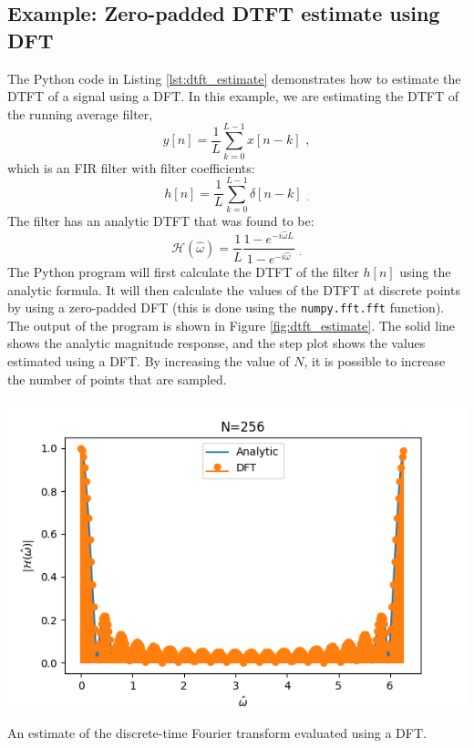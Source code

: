 \subsection{Example: Zero-padded DTFT estimate using DFT}

The Python code in Listing \ref{lst:dtft_estimate} demonstrates how to
estimate the DTFT of a signal using a DFT. In this example, we are
estimating the DTFT of the running average filter,
\begin{equation}
y[n]=\frac{1}{L}\sum_{k=0}^{L-1}x[n-k] \,\,,
\end{equation}
which is an FIR filter with filter coefficients:
\begin{equation}
h[n] = \frac{1}{L}\sum_{k=0}^{L-1}\delta[n-k] \,\, _.
\end{equation}
The filter has an analytic DTFT that was found to be:
\begin{equation}
\mathcal{H}(\hat{\omega}) = \frac{1}{L}\frac{1-e^{-i\hat{\omega}L}}{1-e^{-i\hat{\omega}}} \,\, _.
\end{equation}
The Python program will first calculate the DTFT of the filter $h[n]$
using the analytic formula. It will then calculate the values of the
DTFT at discrete points by using a zero-padded DFT (this is done using
the \verb|numpy.fft.fft| function). The output of the program is shown
in Figure \ref{fig:dtft_estimate}. The solid line shows the analytic
magnitude response, and the step plot shows the values estimated using
a DFT. By increasing the value of $N$, it is possible to increase the
number of points that are sampled.
\begin{marginfigure}
\begin{center}
\includegraphics[width=1.5\textwidth]{code/020_dtft_estimate/dtft_estimate.png}
\end{center}
\caption{An estimate of the discrete-time Fourier transform evaluated using a DFT.}
\label{fig:dtft_estimate}
\end{marginfigure}

